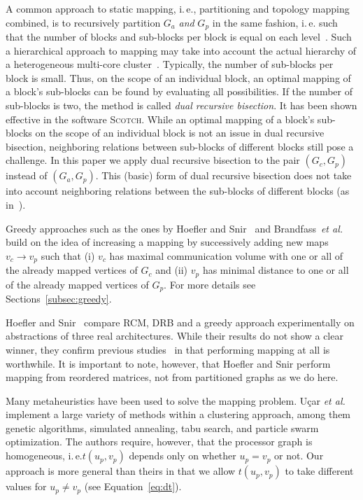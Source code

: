 \documentclass[pdftex]{llncs}
\newcommand{\ie}{i.\,e.\xspace}
\newcommand{\etal}{\textit{et al.}\xspace}
\newcommand{\scotch}{\textsc{Scotch}\xspace}
\begin{document}
A common approach to static mapping, \ie, partitioning and topology
mapping combined, is to recursively partition $G_a$ \emph{and} $G_p$
in the same fashion, \ie such that the number of blocks and sub-blocks
per block is equal on each level~\cite{Pellegrini94static}. Such a
hierarchical approach to mapping may take into account the actual
hierarchy of a heterogeneous multi-core
cluster~\cite{chan2012impact}. Typically, the number of sub-blocks per
block is small. Thus, on the scope of an individual block, an optimal
mapping of a block's sub-blocks can be found by evaluating all
possibilities. If the number of sub-blocks is two, the method is
called \emph{dual recursive bisection}. It has been shown effective in
the software \scotch\cite{Pellegrini07scotch}. While an optimal
mapping of a block's sub-blocks on the scope of an individual block is
not an issue in dual recursive bisection, neighboring relations
between sub-blocks of different blocks still pose a challenge.
In this paper we apply dual recursive bisection to the pair $(G_c,
G_p)$ instead of $(G_a, G_p)$. This (basic) form of dual recursive
bisection does not take into account neighboring relations between the
sub-blocks of different blocks (as in~\cite{hoefler-topomap}).

Greedy approaches such as the ones by Hoefler and Snir~\cite{hoefler-topomap}
and Brandfass~\etal~\cite{Brandfass2013372} build on the idea of
increasing a mapping by successively adding new maps $v_c \rightarrow
v_p$ such that (i) $v_c$ has maximal communication volume with one or
all of the already mapped vertices of $G_c$ and (ii) $v_p$ has minimal
distance to one or all of the already mapped vertices of $G_p$. For
more details see Sections~\ref{subsec:greedy}.

Hoefler and Snir~\cite{hoefler-topomap} compare RCM, DRB and a greedy
approach experimentally on abstractions of three real architectures. While their
results do not show a clear winner, they confirm previous
studies~\cite{Pellegrini11static} in that performing mapping at all is
worthwhile.  It is important to note, however, that Hoefler and Snir
perform mapping from reordered matrices, not from partitioned graphs
as we do here.

Many metaheuristics have been used to solve the mapping problem.
U\c{c}ar \etal~\cite{Ucar200632} implement a large variety of methods
within a clustering approach, among them genetic algorithms, simulated
annealing, tabu search, and particle swarm optimization. The authors
require, however, that the processor graph is homogeneous, \ie $t(u_p,
v_p)$ depends only on whether $u_p = v_p$ or not. Our approach is more
general than theirs in that we allow $t(u_p, v_p)$ to take different
values for $u_p \not= v_p$ (see Equation~\ref{eq:dt}). 
\end{document}
